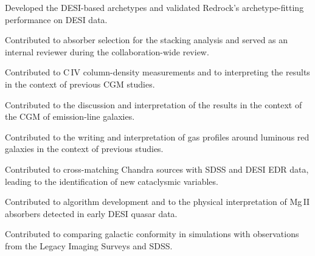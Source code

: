 

Developed the DESI-based archetypes and validated Redrock’s archetype-fitting performance on DESI data.


Contributed to absorber selection for the stacking analysis and served as an internal reviewer during the collaboration-wide review.


Contributed to C\,IV column-density measurements and to interpreting the results in the context of previous CGM studies.


Contributed to the discussion and interpretation of the results in the context of the CGM of emission-line galaxies.


Contributed to the writing and interpretation of gas profiles around luminous red galaxies in the context of previous studies.


Contributed to cross-matching Chandra sources with SDSS and DESI EDR data, leading to the identification of new cataclysmic variables.


Contributed to algorithm development and to the physical interpretation of Mg\,II absorbers detected in early DESI quasar data.


Contributed to comparing galactic conformity in simulations with observations from the Legacy Imaging Surveys and SDSS.